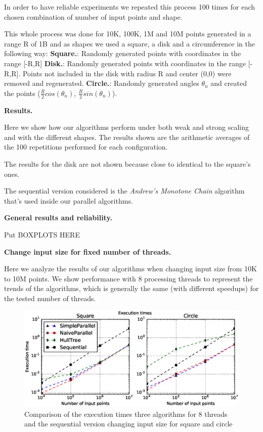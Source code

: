 \documentclass[letterpaper]{article}
\newcommand{\mypar}[1]{{\bf #1.}}
\begin{document}
In order to have reliable experiments we repeated this process 100 times for each chosen combination of number of input points and shape.

This whole process was done for 10K, 100K, 1M and 10M points generated in a range R of 1B and as shapes we used a square, a disk and a circumference in the following way:
\mypar{Square}: Randomly generated points with coordinates in the range [-R,R]
\mypar{Disk}: Randomly generated points with coordinates in the range [-R,R]. Points not included in the disk with radius R and center (0,0) were removed and regenerated.
\mypar{Circle}: Randomly generated angles $\theta_n$ and created the points ($\frac{R}{2}cos(\theta_n)$, $\frac{R}{2}sin(\theta_n)$).

\mypar{Results}

Here we show how our algorithms perform under both weak and strong scaling and with the different shapes. The results shown are the arithmetic averages of the 100 repetitions performed for each configuration.

The results for the disk are not shown because close to identical to the square's ones.

The sequential version considered is the \textit{Andrew's Monotone Chain} algorithm that's used inside our parallel algorithms.

\mypar{General results and reliability}

Put BOXPLOTS HERE

\mypar{Change input size for fixed number of threads}

Here we analyze the results of our algorithms when changing input size from 10K to 10M points. We show performance with 8 processing threads to represent the trends of the algorithms, which is generally the same (with different speedups) for the tested number of threads.

\begin{figure}[!ht]\centering
  \includegraphics[scale=0.33]{./plots/time_points.eps}
  \caption{Comparison of the execution times three algorithms for 8 threads and the sequential version changing input size for square and circle\label{Input size time}}
\end{figure}
\end{document}
